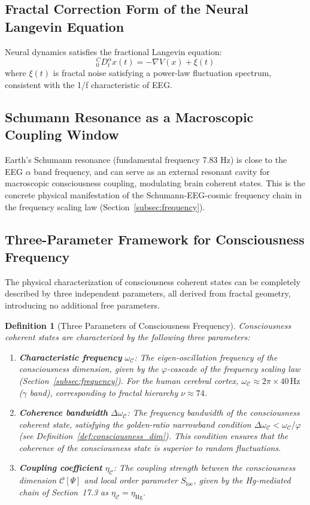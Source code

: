 \documentclass[12pt,a4paper,twocolumn]{article}
\renewcommand{\phi}{\varphi}
\newtheorem{definition}[theorem]{Definition}
\begin{document}
\subsection{Fractal Correction Form of the Neural Langevin Equation}
Neural dynamics satisfies the fractional Langevin equation:
\[
{}_{0}^{C}D_t^\alpha x(t) = -\nabla V(x) + \xi(t)
\]
where $\xi(t)$ is fractal noise satisfying a power-law fluctuation spectrum, consistent with the 1/f characteristic of EEG.

\subsection{Schumann Resonance as a Macroscopic Coupling Window}
Earth's Schumann resonance (fundamental frequency 7.83 Hz) is close to the EEG $\alpha$ band frequency, and can serve as an external resonant cavity for macroscopic consciousness coupling, modulating brain coherent states. This is the concrete physical manifestation of the Schumann-EEG-cosmic frequency chain in the frequency scaling law (Section~\ref{subsec:frequency}).

\subsection{Three-Parameter Framework for Consciousness Frequency}
\label{subsec:three_params}

The physical characterization of consciousness coherent states can be completely described by three independent parameters, all derived from fractal geometry, introducing no additional free parameters.

\begin{definition}[Three Parameters of Consciousness Frequency]
Consciousness coherent states are characterized by the following three parameters:
\begin{enumerate}
\item \textbf{Characteristic frequency} $\omega_{\mathcal{C}}$: The eigen-oscillation frequency of the consciousness dimension, given by the $\phi$-cascade of the frequency scaling law (Section~\ref{subsec:frequency}). For the human cerebral cortex, $\omega_{\mathcal{C}} \approx 2\pi \times 40\,\text{Hz}$ ($\gamma$ band), corresponding to fractal hierarchy $\nu \approx 74$.
\item \textbf{Coherence bandwidth} $\Delta\omega_{\mathcal{C}}$: The frequency bandwidth of the consciousness coherent state, satisfying the golden-ratio narrowband condition $\Delta\omega_{\mathcal{C}} < \omega_{\mathcal{C}}/\phi$ (see Definition~\ref{def:consciousness_dim}). This condition ensures that the coherence of the consciousness state is superior to random fluctuations.
\item \textbf{Coupling coefficient} $\eta_{\mathcal{C}}$: The coupling strength between the consciousness dimension $\mathcal{C}[\Psi]$ and local order parameter $S_{\text{loc}}$, given by the Hg-mediated chain of Section~17.3 as $\eta_{\mathcal{C}} = \eta_{\text{Hg}}$.
\end{enumerate}
\end{definition}
\end{document}
